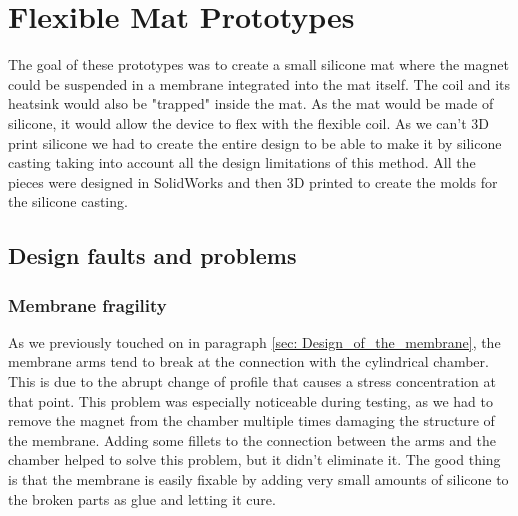 \section{Flexible Mat Prototypes}
\label{sec: Flexible_Mat_Prototypes}
The goal of these prototypes was to create a small silicone mat where the magnet could be suspended in a membrane integrated into the mat itself.
The coil and its heatsink would also be "trapped" inside the mat.
As the mat would be made of silicone, it would allow the device to flex with the flexible coil.
As we can't 3D print silicone we had to create the entire design to be able to make it by silicone casting taking into account all the design limitations of this method.
All the pieces were designed in SolidWorks and then 3D printed to create the molds for the silicone casting. 





\subsection{Design faults and problems}

\subsubsection{Membrane fragility}
As we previously touched on in paragraph \ref{sec: Design_of_the_membrane}, the membrane arms tend to break at the connection with the cylindrical chamber.
This is due to the abrupt change of profile that causes a stress concentration at that point.
This problem was especially noticeable during testing, as we had to remove the magnet from the chamber multiple times damaging the structure of the membrane.
Adding some fillets to the connection between the arms and the chamber helped to solve this problem, but it didn't eliminate it.
The good thing is that the membrane is easily fixable by adding very small amounts of silicone to the broken parts as glue and letting it cure.

